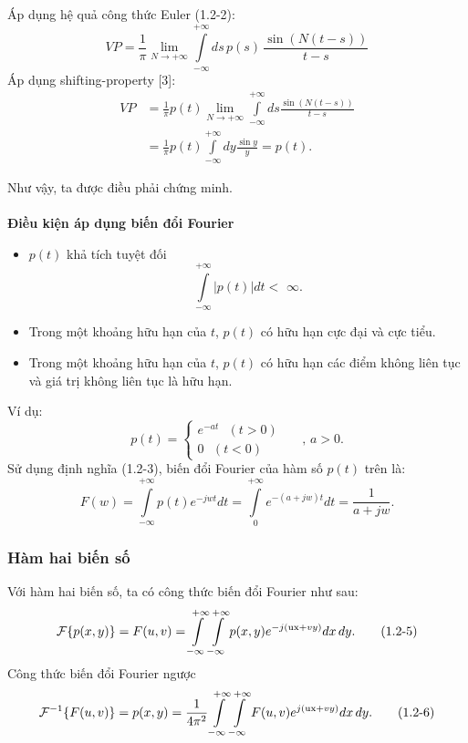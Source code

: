 Áp dụng hệ quả công thức Euler (1.2-2):
$$VP=\frac{1}{{\pi }}\mathop {\lim }\limits_{N \to  + \infty } \int\limits_{ - \infty }^{ + \infty } {ds\,p(s)\,\frac{{\sin (N(t - s))}}{{t - s}}}
$$
Áp dụng shifting-property [3]:
\begin{equation*}
	\begin{split}
	VP &= \frac{1}{\pi }p(t)\mathop {\lim }\limits_{N \to  + \infty } \int\limits_{ - \infty }^{ + \infty } {ds} \frac{{\sin (N(t - s))}}{{t - s}} \\
	& = \frac{1}{\pi }p(t)\int\limits_{ - \infty }^{ + \infty } {dy} \frac{{\sin y}}{y} = p(t).
	\end{split}
\end{equation*}

Như vậy, ta được điều phải chứng minh.\\
\\
\textbf{Điều kiện áp dụng biến đổi Fourier}
\begin{itemize}
    \item $p(t)$ khả tích tuyệt đối
    $$\int\limits_{ - \infty }^{ + \infty } {|p(t)|dt < } \,\,\infty
.$$
    \item Trong một khoảng hữu hạn của $t$, $p(t)$ có hữu hạn cực đại và cực tiểu.
    \item Trong một khoảng hữu hạn của $t$, $p(t)$ có hữu hạn các điểm không liên tục và giá trị không liên tục là hữu hạn.
\end{itemize}

Ví dụ:
$$p(t) = \left\{ {\begin{array}{*{20}{c}}
{{e^{ - at}}\,\,\,\,(t > 0)}\\
{0\,\,\,\,(t < 0)}
\end{array}} \right.\,\,\,\,\,\,\,\,\,,\,a > 0.$$
Sử dụng định nghĩa (1.2-3), biến đổi Fourier của hàm số $p(t)$ trên là:
$$F(w) = \int\limits_{ - \infty }^{ + \infty } {p(t){e^{ - jwt}}dt = \int\limits_0^{ + \infty } {{e^{ - (a + jw)t}}dt = \frac{1}{{a + jw}}} } .$$
\subsubsection{Hàm hai biến số}
Với hàm hai biến số, ta có công thức biến đổi Fourier như sau:
\begin{equation}
\mathcal{F} \{p(x, y)\} = F(u,v) = \int\limits_{ - \infty }^{ + \infty } {\int\limits_{ - \infty }^{ + \infty } {p(x,y){e^{ - j({\rm{ux}} + vy)}}dx\,dy} }.\tag{1.2-5}
\end{equation}
Công thức biến đổi Fourier ngược
\begin{equation}
\mathcal{F}^{-1} \{F(u, v)\} = p(x,y) = \frac{1}{{4{\pi ^2}}}\int\limits_{ - \infty }^{ + \infty } {\int\limits_{ - \infty }^{ + \infty } {F(u,v){e^{j({\rm{ux}} + vy)}}dx\,dy} } .\tag{1.2-6}
\end{equation}
